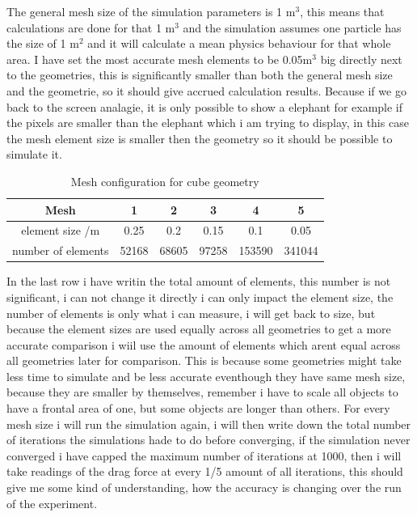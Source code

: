 \documentclass[12pt,a4paper]{article}
\begin{document}
The general mesh size of the simulation parameters is 1 m$^3$, this means that calculations are done for that 1 m$^3$ and the simulation assumes one particle has the size of 1 m$^2$ and it will calculate a mean physics behaviour for that whole area. I have set the most accurate mesh elements to be 0.05m$^3$ big directly next to the geometries, this is significantly smaller than both the general mesh size and the geometrie, so it should give accrued calculation results. Because if we go back to the screen analagie, it is only possible to show a elephant for example if the pixels are smaller than the elephant which i am trying to display, in this case the mesh element size is smaller then the geometry so it should be possible to simulate it.

\begin{table}[H]
\centering
\caption{Mesh configuration for cube geometry}
\label{tab:mesh_config}
\begin{tabular}{|c|c|c|c|c|c|}
\hline
\rowcolor{red!50}
\textbf{Mesh} & \textbf{1} & \textbf{2} & \textbf{3} & \textbf{4} & \textbf{5} \\
\hline
element size /m & 0.25 & 0.2 & 0.15 & 0.1 & 0.05 \\
\hline
number of elements & 52168 & 68605 & 97258 & 153590 & 341044 \\
\hline
\end{tabular}
\end{table}

In the last row i have writin the total amount of elements, this number is not significant, i can not change it directly i can only impact the element size, the number of elements is only what i can measure, i will get back to size, but because the element sizes are used equally across all geometries to get a more accurate comparison i wiil use the amount of elements which arent equal across all geometries later for comparison. This is because some geometries might take less time to simulate and be less accurate eventhough they have same mesh size, because they are smaller by themselves, remember i have to scale all objects to have a frontal area of one, but some objects are longer than others. For every mesh size i will run the simulation again, i will then write down the total number of iterations the simulations hade to do before converging, if the simulation never converged i have capped the maximum number of iterations at 1000, then i will take readings of the drag force at every 1/5 amount of all iterations, this should give me some kind of understanding, how the accuracy is changing over the run of the experiment.
\end{document}
